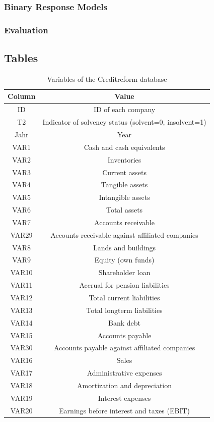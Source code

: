 \documentclass{article}
\begin{document}
\subsubsection{Binary Response Models}
\subsubsection{Evaluation}

\subsection{Tables}
\begin{table}
\caption{Variables of the Creditreform database}
\label{creditVars}
\begin{tabular}{cc} 
\hline\hline
Column & Value\\
\hline
ID & ID of each company\\
T2 & Indicator of solvency status (solvent=0, insolvent=1)\\
Jahr & Year\\
VAR1 & Cash and cash equivalents\\
VAR2 & Inventories\\
VAR3 & Current assets\\
VAR4 & Tangible assets\\
VAR5 & Intangible assets\\
VAR6 & Total assets\\
VAR7 & Accounts receivable\\
VAR29 & Accounts receivable against affiliated companies\\
VAR8 & Lands and buildings\\
VAR9 & Equity (own funds)\\
VAR10 & Shareholder loan\\
VAR11 & Accrual for pension liabilities\\
VAR12 & Total current liabilities\\
VAR13 & Total longterm liabilities\\
VAR14 & Bank debt\\
VAR15 & Accounts payable\\
VAR30 & Accounts payable against affiliated companies\\
VAR16 & Sales\\
VAR17 & Administrative expenses\\
VAR18 & Amortization and depreciation\\
VAR19 & Interest expenses\\
VAR20 & Earnings before interest and taxes (EBIT)\\

\end{tabular}
\end{table}
\end{document}
